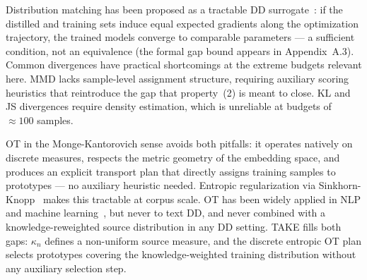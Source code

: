 \begin{foldable} %
    Distribution matching has been proposed as a tractable DD surrogate~\cite{zhao2023dataset}: if the distilled and training sets induce equal expected gradients along the optimization trajectory, the trained models converge to comparable parameters --- a sufficient condition, not an equivalence (the formal gap bound appears in Appendix~A.3).
    Common divergences have practical shortcomings at the extreme budgets relevant here.
    MMD lacks sample-level assignment structure, requiring auxiliary scoring heuristics that reintroduce the gap that property~(2) is meant to close.
    KL and JS divergences require density estimation, which is unreliable at budgets of $\approx\!100$ samples.
\end{foldable}

\begin{foldable} %
    OT in the Monge-Kantorovich sense avoids both pitfalls: it operates natively on discrete measures, respects the metric geometry of the embedding space, and produces an explicit transport plan that directly assigns training samples to prototypes --- no auxiliary heuristic needed.
    Entropic regularization via Sinkhorn-Knopp~\cite{cuturi2013sinkhorn} makes this tractable at corpus scale.
    OT has been widely applied in NLP and machine learning~\cite{kusner2015word,tolstikhin2018wasserstein,courty2016optimal,arjovsky2017wasserstein}, but never to text DD, and never combined with a knowledge-reweighted source distribution in any DD setting.
    TAKE fills both gaps: $\kappa_n$ defines a non-uniform source measure, and the discrete entropic OT plan selects prototypes covering the knowledge-weighted training distribution without any auxiliary selection step.
\end{foldable}
